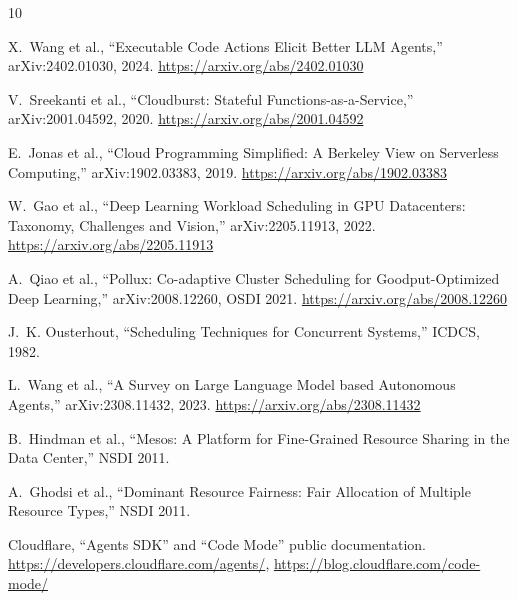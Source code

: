 \documentclass[11pt]{article}
\begin{document}
\begin{thebibliography}{10}

X.~Wang et al., ``Executable Code Actions Elicit Better LLM Agents,''
arXiv:2402.01030, 2024. \url{https://arxiv.org/abs/2402.01030}

V.~Sreekanti et al., ``Cloudburst: Stateful Functions-as-a-Service,''
arXiv:2001.04592, 2020. \url{https://arxiv.org/abs/2001.04592}

E.~Jonas et al., ``Cloud Programming Simplified: A Berkeley View on
Serverless Computing,'' arXiv:1902.03383, 2019.
\url{https://arxiv.org/abs/1902.03383}

W.~Gao et al., ``Deep Learning Workload Scheduling in GPU Datacenters:
Taxonomy, Challenges and Vision,'' arXiv:2205.11913, 2022.
\url{https://arxiv.org/abs/2205.11913}

A.~Qiao et al., ``Pollux: Co-adaptive Cluster Scheduling for
Goodput-Optimized Deep Learning,'' arXiv:2008.12260, OSDI 2021.
\url{https://arxiv.org/abs/2008.12260}

J.~K. Ousterhout, ``Scheduling Techniques for Concurrent Systems,'' ICDCS,
1982.

L.~Wang et al., ``A Survey on Large Language Model based Autonomous
Agents,'' arXiv:2308.11432, 2023. \url{https://arxiv.org/abs/2308.11432}

B.~Hindman et al., ``Mesos: A Platform for Fine-Grained Resource Sharing
in the Data Center,'' NSDI 2011.

A.~Ghodsi et al., ``Dominant Resource Fairness: Fair Allocation of
Multiple Resource Types,'' NSDI 2011.

Cloudflare, ``Agents SDK'' and ``Code Mode'' public documentation.
\url{https://developers.cloudflare.com/agents/},
\url{https://blog.cloudflare.com/code-mode/}

\end{thebibliography}
\end{document}
